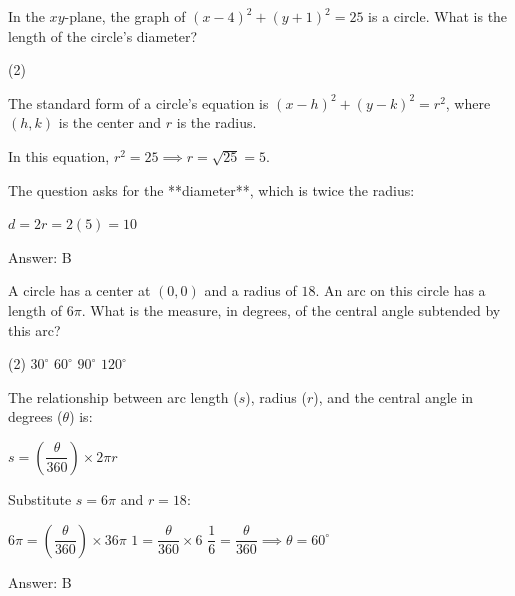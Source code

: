 \documentclass[11pt,paper=a4,answers]{exam}
\begin{document}
\begin{questions}
\question
In the $xy$-plane, the graph of $(x - 4)^2 + (y + 1)^2 = 25$ is a circle. What is the length of the circle's diameter?
\begin{tasks}(2)
\end{tasks}

\begin{solution}
The standard form of a circle's equation is $(x - h)^2 + (y - k)^2 = r^2$, where $(h, k)$ is the center and $r$ is the radius.
\vspace{5pt}
\begin{center}
In this equation, $r^2 = 25 \implies r = \sqrt{25} = 5$.
\end{center}
\vspace{5pt}
The question asks for the **diameter**, which is twice the radius:
\vspace{5pt}
\begin{center}
$d = 2r = 2(5) = 10$
\end{center}
\vspace{5pt}
Answer: \colorbox{yellow!100}{B}
\end{solution}


\question
A circle has a center at $(0,0)$ and a radius of $18$. An arc on this circle has a length of $6\pi$. What is the measure, in degrees, of the central angle subtended by this arc?
\begin{tasks}(2)
    \task $30^\circ$
    \task $60^\circ$
    \task $90^\circ$
    \task $120^\circ$
\end{tasks}

\begin{solution}
The relationship between arc length ($s$), radius ($r$), and the central angle in degrees ($\theta$) is:
\vspace{5pt}
\begin{center}
$s = \left( \dfrac{\theta}{360} \right) \times 2\pi r$
\end{center}
\vspace{5pt}
Substitute $s = 6\pi$ and $r = 18$:
\vspace{5pt}
\begin{center}
$6\pi = \left( \dfrac{\theta}{360} \right) \times 36\pi$
\vspace{5pt}
$1 = \dfrac{\theta}{360} \times 6$
\vspace{5pt}
$\dfrac{1}{6} = \dfrac{\theta}{360} \implies \theta = 60^\circ$
\end{center}
\vspace{5pt}
Answer: \colorbox{yellow!100}{B}
\end{solution}


\end{questions}
\end{document}
